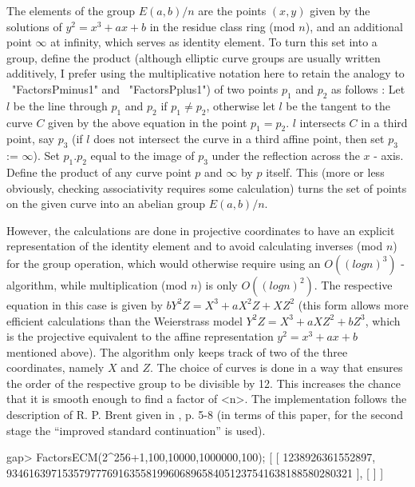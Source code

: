 The elements of the group $E(a,b)/n$ are the points $(x,y)$ given by the
solutions of $y^2 = x^3 + ax + b$ in the residue class ring (mod $n$),
and an additional point $\infty$ at infinity, which serves as 
identity element. 
To turn this set into a group, define the product 
(although elliptic curve groups are usually written additively,
I prefer using the multiplicative notation here to retain the analogy
to ~"FactorsPminus1" and ~"FactorsPplus1") of two points
$p_1$ and $p_2$ as follows :
Let $l$ be the line through $p_1$ and $p_2$ if $p_1 \neq p_2$,
otherwise let $l$ be the tangent to the curve $C$ given by the 
above equation in the point $p_1 = p_2$.
$l$ intersects $C$ in a third point, say $p_3$ 
(if $l$ does not intersect the curve in a
third affine point, then set $p_3$ := $\infty$). 
Set $p_1.p_2$ equal to the image of $p_3$ under
the reflection across the $x$ - axis.
Define the product of any curve point $p$ and $\infty$ by $p$ itself.
This (more or less obviously, checking associativity requires some
calculation) turns the set of points on the given curve
into an abelian group $E(a,b)/n$.

However, the calculations are done in
projective coordinates to have an explicit representation of the 
identity element and to avoid calculating inverses (mod $n$)
for the group operation, which would otherwise require using an 
$O((log n)^3)$ - algorithm, while multiplication (mod $n$) is only 
$O((log n)^2)$. The respective equation in this case is given by 
$bY^2Z = X^3 + aX^2Z + XZ^2$ (this form allows more efficient
calculations than the
Weierstrass model 
$Y^2Z = X^3 + aXZ^2 + bZ^3$, which is the projective equivalent to
the affine representation $y^2 = x^3 + ax + b$ mentioned above).
The algorithm only keeps track of two of the three coordinates,
namely $X$ and $Z$.
The choice of curves is done in a way that ensures the order of
the respective group to be divisible by 12. This increases the
chance that it is smooth enough to find a factor of <n>.
The implementation follows the description of R. P. Brent given in
\cite{BrentsECM}, p. 5-8 (in terms of this paper,
for the second stage the ``improved standard continuation'' is used).

\beginexample
gap> FactorsECM(2^256+1,100,10000,1000000,100);
[ [ 1238926361552897, 
      93461639715357977769163558199606896584051237541638188580280321 ], [  ] ]
\endexample


